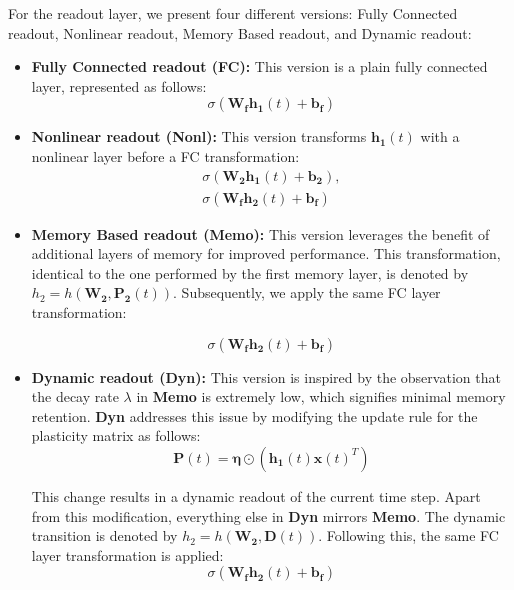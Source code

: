 \documentclass{article}
\begin{document}
For the readout layer, we present four different versions: Fully Connected readout, Nonlinear readout, Memory Based readout, and Dynamic readout:

\begin{itemize}
    \item \textbf{Fully Connected readout (\textbf{FC}):} This version is a plain fully connected layer, represented as follows:
    \begin{equation}
    \sigma\left(\boldsymbol{W_f} \boldsymbol{h_1}(t)+\boldsymbol{b_f}\right)
    \end{equation}
    
    \item \textbf{Nonlinear readout (\textbf{Nonl}):} This version transforms $\boldsymbol{h_1}(t)$ with a nonlinear layer before a FC transformation:
    \begin{align}
    \sigma\left(\boldsymbol{W_2} \boldsymbol{h_1}(t)+\boldsymbol{b_2}\right), \\
    \sigma\left(\boldsymbol{W_f} \boldsymbol{h_2}(t)+\boldsymbol{b_f}\right)
    \end{align}
    
    \item \textbf{Memory Based readout (\textbf{Memo}):} This version leverages the benefit of additional layers of memory for improved performance. This transformation, identical to the one performed by the first memory layer, is denoted by $h_2 = h(\boldsymbol{W_2},\boldsymbol{P_2}(t))$. Subsequently, we apply the same FC layer transformation:

\begin{equation}
\sigma\left(\boldsymbol{W_f} \boldsymbol{h_2}(t)+\boldsymbol{b_f}\right)
\end{equation}

\item \textbf{Dynamic readout (\textbf{Dyn}):} This version is inspired by the observation that the decay rate $\lambda$ in \textbf{Memo} is extremely low, which signifies minimal memory retention. \textbf{Dyn} addresses this issue by modifying the update rule for the plasticity matrix as follows:
\begin{equation}
\boldsymbol{P}(t)= \boldsymbol{\eta} \odot\left(\boldsymbol{h_1}(t) \boldsymbol{x}(t)^T\right)
\end{equation}

This change results in a dynamic readout of the current time step. Apart from this modification, everything else in \textbf{Dyn} mirrors \textbf{Memo}. The dynamic transition is denoted by $h_2 = h(\boldsymbol{W_2},\boldsymbol{D}(t))$. Following this, the same FC layer transformation is applied:
\begin{equation}
\sigma\left(\boldsymbol{W_f} \boldsymbol{h_2}(t)+\boldsymbol{b_f}\right)
\end{equation}
\end{itemize}
\end{document}
